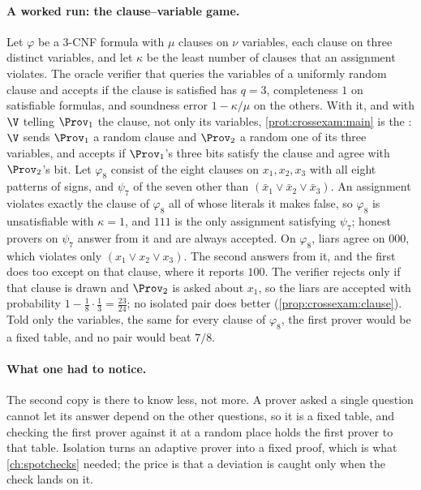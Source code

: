 \begin{refsection}
\paragraph{A worked run: the clause--variable game.} Let $\varphi$ be a 3-CNF formula with $\mu$ clauses on $\nu$ variables, each clause on three distinct variables, and let $\kappa$ be the least number of clauses that an assignment violates. The oracle verifier that queries the variables of a uniformly random clause and accepts if the clause is satisfied has $q=3$, completeness $1$ on satisfiable formulas, and soundness error $1-\kappa/\mu$ on the others. With it, and with $\V$ telling $\Prov_1$ the clause, not only its variables, \cref{prot:crossexam:main} is the : $\V$ sends $\Prov_1$ a random clause and $\Prov_2$ a random one of its three variables, and accepts if $\Prov_1$'s three bits satisfy the clause and agree with $\Prov_2$'s bit. Let $\varphi_8$ consist of the eight clauses on $x_1,x_2,x_3$ with all eight patterns of signs, and $\psi_7$ of the seven other than $(\bar x_1\vee\bar x_2\vee\bar x_3)$. An assignment violates exactly the clause of $\varphi_8$ all of whose literals it makes false, so $\varphi_8$ is unsatisfiable with $\kappa=1$, and $111$ is the only assignment satisfying $\psi_7$; honest provers on $\psi_7$ answer from it and are always accepted. On $\varphi_8$, liars agree on $000$, which violates only $(x_1\vee x_2\vee x_3)$. The second answers from it, and the first does too except on that clause, where it reports $100$. The verifier rejects only if that clause is drawn and $\Prov_2$ is asked about $x_1$, so the liars are accepted with probability $1-\frac18\cdot\frac13=\frac{23}{24}$; no isolated pair does better (\cref{prop:crossexam:clause}). Told only the variables, the same for every clause of $\varphi_8$, the first prover would be a fixed table, and no pair would beat $7/8$.

\paragraph{What one had to notice.} The second copy is there to know less, not more. A prover asked a single question cannot let its answer depend on the other questions, so it is a fixed table, and checking the first prover against it at a random place holds the first prover to that table. Isolation turns an adaptive prover into a fixed proof, which is what \cref{ch:spotchecks} needed; the price is that a deviation is caught only when the check lands on it.


\end{refsection}
